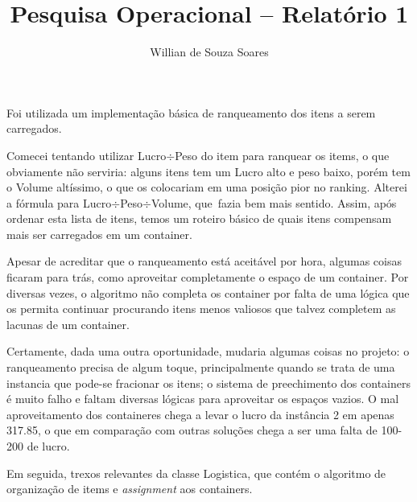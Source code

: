 \documentclass[12pt]{article}
\title{Pesquisa Operacional – Relatório 1}
\author{Willian de Souza Soares}
\date{}
\renewcommand{\_}{\kern-1.5pt\textunderscore\kern-1.5pt}
\begin{document}
\maketitle
\setlength{\parskip}{6.0pt}
\par


\par


\vspace{\baselineskip}
{\fontsize{13pt}{15.6pt}\selectfont \tab Foi utilizada um implementação básica de ranqueamento dos itens a serem carregados.\par}\par

{\fontsize{13pt}{15.6pt}\selectfont \tab Comecei tentando utilizar Lucro$  \div $Peso do item para ranquear os items, o que obviamente não serviria: alguns itens tem um Lucro alto e peso baixo, porém tem o Volume altíssimo, o que os colocariam em uma posição pior no ranking. Alterei a fórmula para Lucro$  \div $Peso$  \div $Volume, que\  fazia bem mais sentido. Assim, após ordenar esta lista de itens, temos um roteiro básico de quais itens compensam mais ser carregados em um container.\par}\par

{\fontsize{13pt}{15.6pt}\selectfont \tab Apesar de acreditar que o ranqueamento está aceitável por hora, algumas coisas ficaram para trás, como aproveitar completamente o espaço de um container. Por diversas vezes, o algoritmo não completa os container por falta de uma lógica que os permita continuar procurando itens menos valiosos que talvez completem as lacunas de um container.\par}\par

{\fontsize{13pt}{15.6pt}\selectfont \tab Certamente, dada uma outra oportunidade, mudaria algumas coisas no projeto: o ranqueamento precisa de algum toque, principalmente quando se trata de uma instancia que pode-se fracionar os itens; o sistema de preechimento dos containers é muito falho e faltam diversas lógicas para aproveitar os espaços vazios. O mal aproveitamento dos containeres chega a levar o lucro da instância 2 em apenas 317.85, o que em comparação com outras soluções chega a ser uma falta de 100-200 de lucro.\par}\par


\vspace{\baselineskip}
{\fontsize{13pt}{15.6pt}\selectfont Em seguida, trexos relevantes da classe Logistica, que contém o algoritmo de organização de items e \textit{assignment} aos containers.\par}\par
\end{document}
